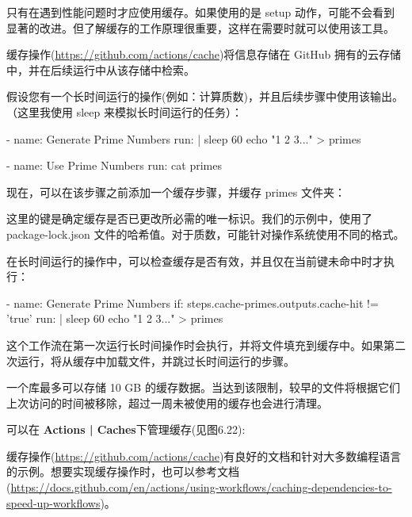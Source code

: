 
只有在遇到性能问题时才应使用缓存。如果使用的是 setup 动作，可能不会看到显著的改进。但了解缓存的工作原理很重要，这样在需要时就可以使用该工具。

缓存操作(\url{https://github.com/actions/cache})将信息存储在 GitHub 拥有的云存储中，并在后续运行中从该存储中检索。

假设您有一个长时间运行的操作(例如：计算质数)，并且后续步骤中使用该输出。（这里我使用 sleep 来模拟长时间运行的任务）：

\begin{shell}
- name: Generate Prime Numbers
  run: |
    sleep 60
    echo "1 2 3..." > primes

- name: Use Prime Numbers
  run: cat primes
\end{shell}

现在，可以在该步骤之前添加一个缓存步骤，并缓存 primes 文件夹：


这里的键是确定缓存是否已更改所必需的唯一标识。我们的示例中，使用了 package-lock.json 文件的哈希值。对于质数，可能针对操作系统使用不同的格式。

在长时间运行的操作中，可以检查缓存是否有效，并且仅在当前键未命中时才执行：

\begin{shell}
- name: Generate Prime Numbers
  if: steps.cache-primes.outputs.cache-hit != 'true'
  run: |
    sleep 60
    echo "1 2 3..." > primes
\end{shell}

这个工作流在第一次运行长时间操作时会执行，并将文件填充到缓存中。如果第二次运行，将从缓存中加载文件，并跳过长时间运行的步骤。


一个库最多可以存储 10 GB 的缓存数据。当达到该限制，较早的文件将根据它们上次访问的时间被移除，超过一周未被使用的缓存也会进行清理。

可以在 \textbf{Actions | Caches}下管理缓存(见图6.22):


缓存操作(\url{https://github.com/actions/cache})有良好的文档和针对大多数编程语言的示例。想要实现缓存操作时，也可以参考文档(\url{https://docs.github.com/en/actions/using-workflows/caching-dependencies-to-speed-up-workflows})。